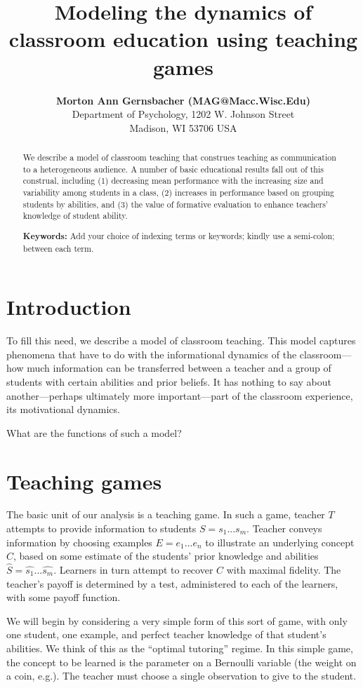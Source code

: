 \documentclass[10pt,letterpaper]{article}
\title{Modeling the dynamics of classroom education using teaching games}
\author{{\large \bf Morton Ann Gernsbacher (MAG@Macc.Wisc.Edu)} \\
  Department of Psychology, 1202 W. Johnson Street \\
  Madison, WI 53706 USA}
\begin{document}
\maketitle


\begin{abstract}
We describe a model of classroom teaching that construes teaching as communication to a heterogeneous audience. A number of basic educational results fall out of this construal, including (1) decreasing mean performance with the increasing size and variability among students in a class, (2) increases in performance based on grouping students by abilities, and (3) the value of formative evaluation to enhance teachers' knowledge of student ability.

\textbf{Keywords:} 
Add your choice of indexing terms or keywords; kindly use a semi-colon; between each term.
\end{abstract}


\section{Introduction}

To fill this need, we describe a model of classroom teaching. This model captures phenomena that have to do with the informational dynamics of the classroom---how much information can be transferred between a teacher and a group of students with certain abilities and prior beliefs. It has nothing to say about another---perhaps ultimately more important---part of the classroom experience, its motivational dynamics.  

What are the functions of such a model? 

\section{Teaching games}

The basic unit of our analysis is a teaching game. In such a game, teacher $T$ attempts to provide information to students $S = {s_1 ... s_m}$. Teacher conveys information by choosing examples $E = {e_1 ... e_n}$ to illustrate an underlying concept $C$, based on some estimate of the students' prior knowledge and abilities $\hat{S} = {\hat{s_1} ... \hat{s_m}}$. Learners in turn attempt to recover $C$ with maximal fidelity. The teacher's payoff is determined by a test, administered to each of the learners, with some payoff function. 

We will begin by considering a very simple form of this sort of game, with only one student, one example, and perfect teacher knowledge of that student's abilities. We think of this as the ``optimal tutoring'' regime. In this simple game, the concept to be learned is the parameter on a Bernoulli variable (the weight on a coin, e.g.). The teacher must choose a single observation to give to the student. 
\end{document}
